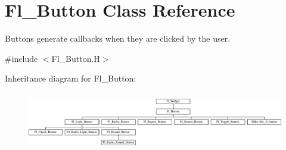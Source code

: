 \hypertarget{class_fl___button}{}\section{Fl\+\_\+\+Button Class Reference}
\label{class_fl___button}


Buttons generate callbacks when they are clicked by the user.  




{\ttfamily \#include $<$Fl\+\_\+\+Button.\+H$>$}

Inheritance diagram for Fl\+\_\+\+Button\+:\begin{figure}[H]
\begin{center}
\leavevmode
\includegraphics[height=2.580645cm]{class_fl___button}
\end{center}
\end{figure}
